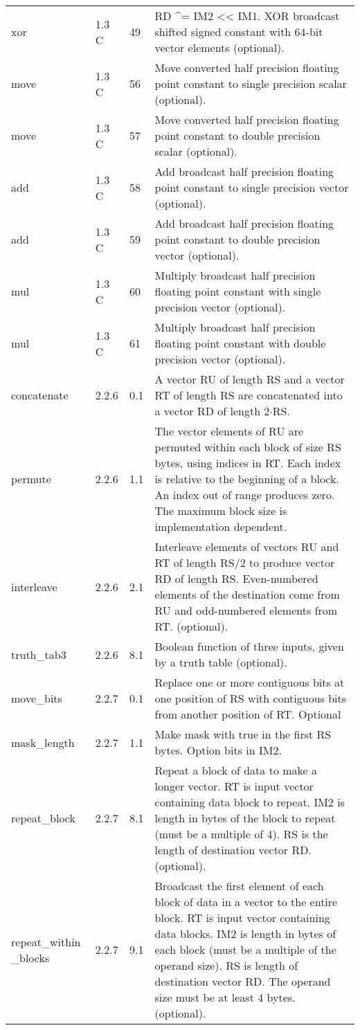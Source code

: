 \documentclass[forwardcom.tex]{subfiles}
\begin{document}
\begin{longtable} {|p{25mm}|p{12mm}|p{12mm}|p{95mm}|}
xor           & 1.3 C & 49 & RD \^{}= IM2 \textless\textless{} IM1. XOR broadcast shifted signed constant with 64-bit vector elements (optional). \\
move          & 1.3 C & 56 & Move converted half precision floating point constant to single
precision scalar (optional). \\
move          & 1.3 C & 57 & Move converted half precision floating point constant to double
precision scalar (optional). \\
add           & 1.3 C & 58 & Add broadcast half precision floating point constant to single
precision vector (optional). \\
add           & 1.3 C & 59 & Add broadcast half precision floating point constant to double
precision vector (optional). \\
mul           & 1.3 C & 60 & Multiply broadcast half precision floating point constant with single precision vector (optional). \\
mul           & 1.3 C & 61 & Multiply broadcast half precision floating point constant with double precision vector (optional). \\

concatenate   & 2.2.6 & 0.1 & A vector RU of length RS and a vector RT of length RS are
concatenated into a vector RD of length 2$\cdot$RS. \\
permute       & 2.2.6 & 1.1 & The vector elements of RU are permuted within each block of size RS bytes, using indices in RT. Each index is relative to the
beginning of a block. An index out of range produces zero. The
maximum block size is implementation dependent. \\
interleave    & 2.2.6 & 2.1 & Interleave elements of vectors RU and RT of length RS/2 to produce vector RD of length RS. Even-numbered elements of the destination come from RU and odd-numbered elements from RT. (optional). \\
truth\_tab3   & 2.2.6 & 8.1 & Boolean function of three inputs, given by a truth table (optional). \\

move\_bits    & 2.2.7 & 0.1 & Replace one or more contiguous bits at one position of RS with contiguous bits from another position of RT. Optional \\
mask\_length  & 2.2.7 & 1.1 & Make mask with true in the first RS bytes. Option bits in IM2. \\
repeat\_block  & 2.2.7 & 8.1 & Repeat a block of data to make a longer vector. RT is input vector containing data block to repeat. IM2 is length in bytes of the block to repeat (must be a multiple of 4). RS is the length of destination vector RD. (optional). \\
repeat\_within \_blocks & 2.2.7 & 9.1 & Broadcast the first element of each block of data in a vector to the entire block. RT is input vector containing data blocks. IM2 is length in bytes of each block (must be a multiple of the operand size). RS is length of destination vector RD. The operand size must be at least 4 bytes. (optional). \\


\end{longtable}
\end{document}
